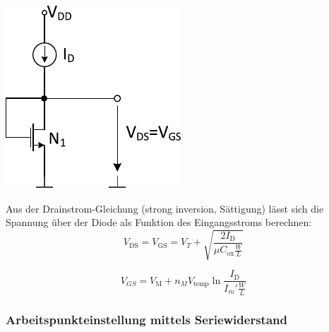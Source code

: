 \begin{minipage}[t]{0.3\columnwidth}
    \includegraphics[width=\columnwidth, align=t]{images/04_MOS_diode_mit_stromquelle.pdf}
\end{minipage}
\hfill
\begin{minipage}[t]{0.66\columnwidth}
    Aus der Drainstrom-Gleichung (strong inversion, Sättigung) lässt sich die Spannung über der Diode als Funktion des Eingangsstroms berechnen:
    \[
        V_\text{DS} = V_\text{GS} = V_T + \sqrt{\frac{2 I_\text{D}}{\mu C_\text{ox} \frac{W}{L}}}
    \]

    \[
        V_{GS} = V_\text{M} + n_M V_\text{temp} \ln{\frac{I_\text{D}}{I_m' \frac{W}{L}}}
    \]
\end{minipage}


\subsubsection{Arbeitspunkteinstellung mittels Seriewiderstand}

